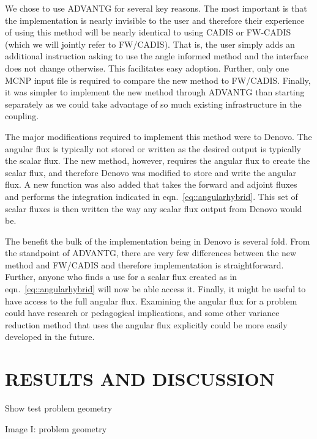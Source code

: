 \documentclass[12pt]{article}
\begin{document}
We chose to use ADVANTG for several key reasons. 
The most important is that the implementation is nearly invisible to the user and therefore their experience of using this method will be nearly identical to using CADIS or FW-CADIS (which we will jointly refer to FW/CADIS).
That is, the user simply adds an additional instruction asking to use the angle informed method and the interface does not change otherwise.
This facilitates easy adoption.
Further, only one MCNP input file is required to compare the new method to FW/CADIS.
Finally, it was simpler to implement the new method through ADVANTG than starting separately as we could take advantage of so much existing infrastructure in the coupling.

The major modifications required to implement this method were to Denovo. 
The angular flux is typically not stored or written as the desired output is typically the scalar flux.
The new method, however, requires the angular flux to create the scalar flux, and therefore Denovo was modified to store and write the angular flux.
A new function was also added that takes the forward and adjoint fluxes and performs the integration indicated in eqn.~\eqref{eq::angularhybrid}. 
This set of scalar fluxes is then written the way any scalar flux output from Denovo would be.

The benefit the bulk of the implementation being in Denovo is several fold. 
From the standpoint of ADVANTG, there are very few differences between the new method and FW/CADIS and therefore implementation is straightforward.
Further, anyone who finds a use for a scalar flux created as in eqn.~\eqref{eq::angularhybrid} will now be able  access it.
Finally, it might be useful to have access to the full angular flux. 
Examining the angular flux for a problem could have research or pedagogical implications, and some other variance reduction method that uses the angular flux explicitly could be more easily developed in the future.

%
\section{RESULTS AND DISCUSSION} 
\label{sect::results}

Show test problem geometry

Image I: problem geometry \\
\end{document}
